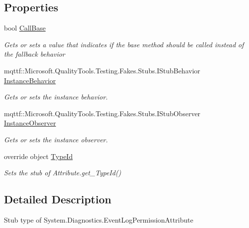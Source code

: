 \subsection*{Properties}
\begin{DoxyCompactItemize}
\item 
bool \hyperlink{class_system_1_1_diagnostics_1_1_fakes_1_1_stub_event_log_permission_attribute_a07fe841042b30ff2264e747be0842df2}{Call\-Base}
\begin{DoxyCompactList}\small\item\em Gets or sets a value that indicates if the base method should be called instead of the fallback behavior\end{DoxyCompactList}\item 
mqttf\-::\-Microsoft.\-Quality\-Tools.\-Testing.\-Fakes.\-Stubs.\-I\-Stub\-Behavior \hyperlink{class_system_1_1_diagnostics_1_1_fakes_1_1_stub_event_log_permission_attribute_a5c34b0f94b733026ac861884c1bbbab8}{Instance\-Behavior}
\begin{DoxyCompactList}\small\item\em Gets or sets the instance behavior.\end{DoxyCompactList}\item 
mqttf\-::\-Microsoft.\-Quality\-Tools.\-Testing.\-Fakes.\-Stubs.\-I\-Stub\-Observer \hyperlink{class_system_1_1_diagnostics_1_1_fakes_1_1_stub_event_log_permission_attribute_a869891ba8c29475036eec573f10782bd}{Instance\-Observer}
\begin{DoxyCompactList}\small\item\em Gets or sets the instance observer.\end{DoxyCompactList}\item 
override object \hyperlink{class_system_1_1_diagnostics_1_1_fakes_1_1_stub_event_log_permission_attribute_a4c1e292d5299b6f887dc19d80de9c3c4}{Type\-Id}
\begin{DoxyCompactList}\small\item\em Sets the stub of Attribute.\-get\-\_\-\-Type\-Id()\end{DoxyCompactList}\end{DoxyCompactItemize}


\subsection{Detailed Description}
Stub type of System.\-Diagnostics.\-Event\-Log\-Permission\-Attribute




